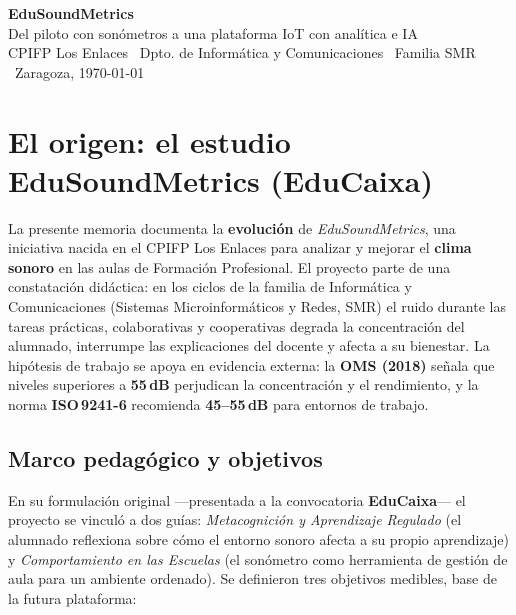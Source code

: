 \documentclass[11pt,a4paper]{article}
\begin{document}
\begin{tcolorbox}[colback=CorpDark, colframe=CorpDark, coltext=white, arc=4pt, boxsep=4pt,
  left=12pt, right=12pt, top=9pt, bottom=9pt]
  {\LARGE\bfseries\textcolor{CorpAccent}{\faBroadcastTower}\hspace{0.4em}EduSoundMetrics}\\[2pt]
  {\normalsize Del piloto con son\'ometros a una plataforma IoT con anal\'itica e IA}\\[3pt]
  {\footnotesize CPIFP Los Enlaces \textbullet\ Dpto. de Inform\'atica y Comunicaciones \textbullet\ Familia SMR \textbullet\ Zaragoza, \today}
\end{tcolorbox}

\vspace{3pt}

\section{El origen: el estudio EduSoundMetrics (EduCaixa)}

La presente memoria documenta la \textbf{evoluci\'on} de \emph{EduSoundMetrics}, una iniciativa nacida en el CPIFP Los Enlaces para analizar y mejorar el \textbf{clima sonoro} en las aulas de Formaci\'on Profesional. El proyecto parte de una constataci\'on did\'actica: en los ciclos de la familia de Inform\'atica y Comunicaciones (Sistemas Microinform\'aticos y Redes, SMR) el ruido durante las tareas pr\'acticas, colaborativas y cooperativas degrada la concentraci\'on del alumnado, interrumpe las explicaciones del docente y afecta a su bienestar. La hip\'otesis de trabajo se apoya en evidencia externa: la \textbf{OMS (2018)} se\~nala que niveles superiores a \textbf{55\,dB} perjudican la concentraci\'on y el rendimiento, y la norma \textbf{ISO\,9241-6} recomienda \textbf{45--55\,dB} para entornos de trabajo.

\subsection{Marco pedag\'ogico y objetivos}
En su formulaci\'on original ---presentada a la convocatoria \textbf{EduCaixa}--- el proyecto se vincul\'o a dos gu\'ias: \emph{Metacognici\'on y Aprendizaje Regulado} (el alumnado reflexiona sobre c\'omo el entorno sonoro afecta a su propio aprendizaje) y \emph{Comportamiento en las Escuelas} (el son\'ometro como herramienta de gesti\'on de aula para un ambiente ordenado). Se definieron tres objetivos medibles, base de la futura plataforma:
\end{document}
